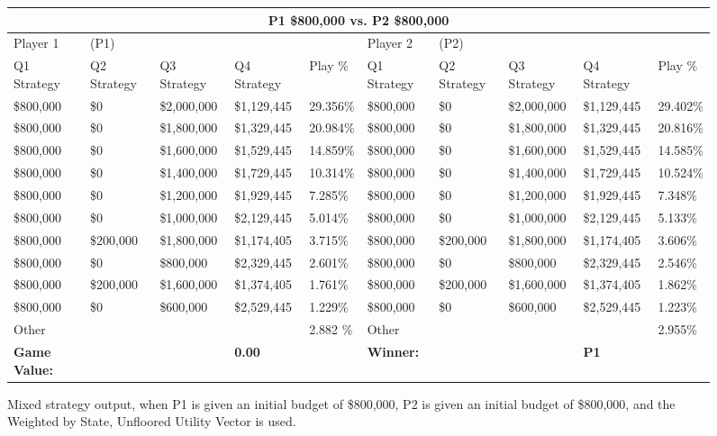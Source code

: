 \documentclass[11pt]{article}
\begin{document}
\begin{figure}
\tiny
\begin{tabular}{ |p{1.0cm}p{1.0cm}p{1.0cm}p{2.0cm}|p{1.0cm}||p{1.0cm}p{1.0cm}p{1.0cm}p{2.0cm}|p{1.0cm}|}
\hline
\multicolumn{10}{|c|}{P1 \$800,000 vs. P2 \$800,000} \\
\hline
Player 1 & (P1) & & & & Player 2 & (P2) & & & \\
\hline
Q1 Strategy & Q2 Strategy & Q3 Strategy & Q4 Strategy  &  Play \% & Q1 Strategy & Q2 Strategy & Q3 Strategy & Q4 Strategy  &  Play \%\\
\hline
\$800,000 & \$0 & \$2,000,000 & \$1,129,445 & 29.356\% & \$800,000 & \$0 & \$2,000,000 & \$1,129,445 & 29.402\% \\
\$800,000 & \$0 & \$1,800,000 & \$1,329,445 & 20.984\% & \$800,000 & \$0 & \$1,800,000 & \$1,329,445 & 20.816\% \\
\$800,000 & \$0 & \$1,600,000 & \$1,529,445 & 14.859\% & \$800,000 & \$0 & \$1,600,000 & \$1,529,445 & 14.585\% \\
\$800,000 & \$0 & \$1,400,000 & \$1,729,445 & 10.314\% & \$800,000 & \$0 & \$1,400,000 & \$1,729,445 & 10.524\% \\
\$800,000 & \$0 & \$1,200,000 & \$1,929,445 & 7.285\% & \$800,000 & \$0 & \$1,200,000 & \$1,929,445 & 7.348\% \\
\$800,000 & \$0 & \$1,000,000 & \$2,129,445 & 5.014\% & \$800,000 & \$0 & \$1,000,000 & \$2,129,445 & 5.133\% \\
\$800,000 & \$200,000 & \$1,800,000 & \$1,174,405 & 3.715\% & \$800,000 & \$200,000 & \$1,800,000 & \$1,174,405 & 3.606\% \\
\$800,000 & \$0 & \$800,000 & \$2,329,445 & 2.601\% & \$800,000 & \$0 & \$800,000 & \$2,329,445 & 2.546\% \\
\$800,000 & \$200,000 & \$1,600,000 & \$1,374,405 & 1.761\% & \$800,000 & \$200,000 & \$1,600,000 & \$1,374,405 & 1.862\% \\
\$800,000 & \$0 & \$600,000 & \$2,529,445 & 1.229\% & \$800,000 & \$0 & \$600,000 & \$2,529,445 & 1.223\% \\
\hline
Other &  &  &  & 2.882 \% & Other &  &  &  & 2.955\% \\
\hline
\small \textbf{Game Value:} &&& \small \textbf{0.00} && \small \textbf{Winner:} &&& \small \textbf{P1}&\\
\hline
\end{tabular}
\caption{Mixed strategy output, when P1 is given an initial budget of \$800,000, P2 is given an initial budget of \$800,000, and the Weighted by State, Unfloored Utility Vector is used.}
\label{8v8table.5}
\end{figure}
\end{document}
